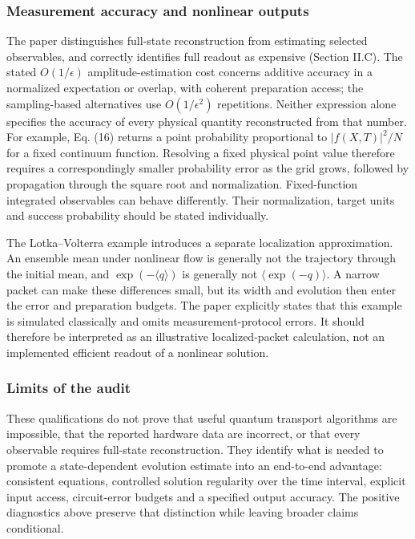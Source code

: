 \subsubsection{Measurement accuracy and nonlinear
outputs}\label{measurement-accuracy-and-nonlinear-outputs}

The paper distinguishes full-state reconstruction from estimating
selected observables, and correctly identifies full readout as expensive
(Section II.C). The stated \(O(1/\epsilon)\) amplitude-estimation cost
concerns additive accuracy in a normalized expectation or overlap, with
coherent preparation access; the sampling-based alternatives use
\(O(1/\epsilon^2)\) repetitions. Neither expression alone specifies the
accuracy of every physical quantity reconstructed from that number. For
example, Eq. (16) returns a point probability proportional to
\(|f(X,T)|^2/N\) for a fixed continuum function. Resolving a fixed
physical point value therefore requires a correspondingly smaller
probability error as the grid grows, followed by propagation through the
square root and normalization. Fixed-function integrated observables can
behave differently. Their normalization, target units and success
probability should be stated individually.

The Lotka--Volterra example introduces a separate localization
approximation. An ensemble mean under nonlinear flow is generally not
the trajectory through the initial mean, and \(\exp(-\langle q\rangle)\)
is generally not \(\langle\exp(-q)\rangle\). A narrow packet can make
these differences small, but its width and evolution then enter the
error and preparation budgets. The paper explicitly states that this
example is simulated classically and omits measurement-protocol errors.
It should therefore be interpreted as an illustrative localized-packet
calculation, not an implemented efficient readout of a nonlinear
solution.

\subsubsection{Limits of the audit}\label{limits-of-the-audit}

These qualifications do not prove that useful quantum transport
algorithms are impossible, that the reported hardware data are
incorrect, or that every observable requires full-state reconstruction.
They identify what is needed to promote a state-dependent evolution
estimate into an end-to-end advantage: consistent equations, controlled
solution regularity over the time interval, explicit input access,
circuit-error budgets and a specified output accuracy. The positive
diagnostics above preserve that distinction while leaving broader claims
conditional.

